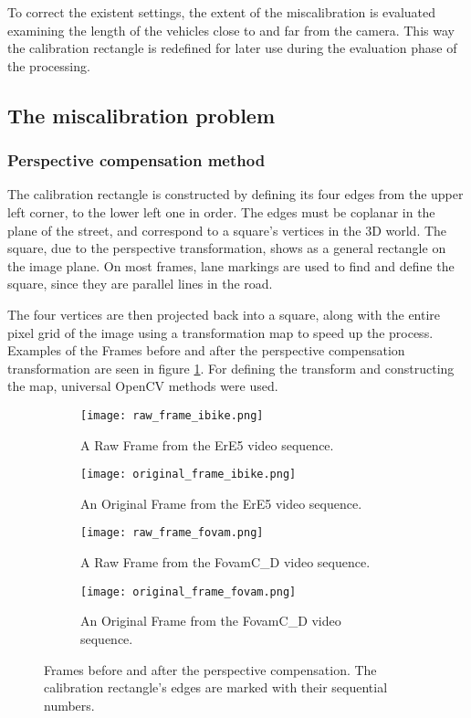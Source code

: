 To correct the existent settings, the extent of the miscalibration is evaluated examining the length of the vehicles close to and far from the camera.
This way the calibration rectangle is redefined for later use during the evaluation phase of the processing.

\subsection{The miscalibration problem}
\subsubsection{Perspective compensation method}
The calibration rectangle is constructed by defining its four edges from the upper left corner, to the lower left one in order.
The edges must be coplanar in the plane of the street, and correspond to a square's vertices in the 3D world.
The square, due to the perspective transformation, shows as a general rectangle on the image plane.
On most frames, lane markings are used to find and define the square, since they are parallel lines in the road.

The four vertices are then projected back into a square, along with the entire pixel grid of the image using a transformation map to speed up the process.
Examples of the Frames before and after the perspective compensation transformation are seen in figure \ref{fig:perscomp}.
For defining the transform and constructing the map, universal OpenCV methods were used\cite{PersTrans, WrapPers}.

\begin{figure}[!t]
	\centering
		\begin{subfigure}[b]{0.4\textwidth}
			\texttt{[image: raw\_frame\_ibike.png]}
			\caption{A Raw Frame from the ErE5 video sequence.}
		\end{subfigure}
		\quad
		\begin{subfigure}[b]{0.4\textwidth}
			\texttt{[image: original\_frame\_ibike.png]}
			\caption{An Original Frame from the ErE5 video sequence.}
		\end{subfigure}
		\hfill
		\begin{subfigure}[b]{0.4\textwidth}
			\texttt{[image: raw\_frame\_fovam.png]}
			\caption{A Raw Frame from the FovamC\_D video sequence.}
		\end{subfigure}
		\quad
		\begin{subfigure}[b]{0.4\textwidth}
			\texttt{[image: original\_frame\_fovam.png]}
			\caption{An Original Frame from the FovamC\_D video sequence.}
		\end{subfigure}
		
		\caption{Frames before and after the perspective compensation. The calibration rectangle's edges are marked with their sequential numbers.\label{fig:perscomp}}
\end{figure}

